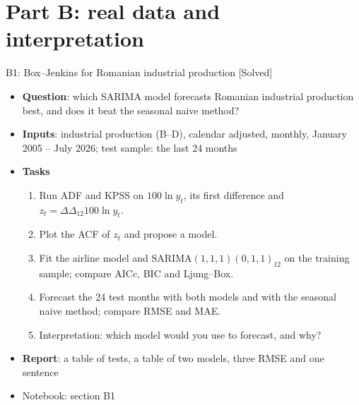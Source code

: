 \section{Part B: real data and interpretation}

\begin{frame}{B1: Box--Jenkins for Romanian industrial production [Solved]}
\itemsize{\footnotesize}
\begin{itemize}
\item \textbf{Question}: which SARIMA model forecasts Romanian industrial production best, and does it beat the seasonal naive method?
\item \textbf{Inputs}: industrial production (B--D), calendar adjusted, monthly, January 2005 -- July 2026; test sample: the last 24 months
\item \textbf{Tasks}
\begin{enumerate}
    \item Run ADF and KPSS on $100\ln y_t$, its first difference and $z_t = \Delta\Delta_{12}100\ln y_t$.
    \item Plot the ACF of $z_t$ and propose a model.
    \item Fit the airline model and SARIMA$(1,1,1)(0,1,1)_{12}$ on the training sample; compare AICc, BIC and Ljung--Box.
    \item Forecast the 24 test months with both models and with the seasonal naive method; compare RMSE and MAE.
    \item Interpretation: which model would you use to forecast, and why?
\end{enumerate}
\item \textbf{Report}: a table of tests, a table of two models, three RMSE and one sentence
\item Notebook: section B1
\end{itemize}
\end{frame}

